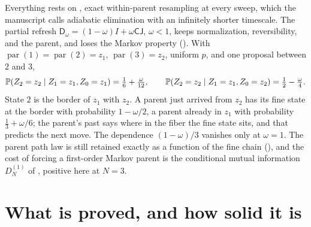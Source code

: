 Everything rests on , exact within-parent resampling at every
sweep, which the manuscript calls adiabatic elimination with an infinitely shorter timescale. The
partial refresh $\mathsf D_\omega=(1-\omega)I+\omega\mathsf C\mathsf J$, $\omega<1$, keeps
normalization, reversibility, and the parent, and loses the Markov property
(). With $\operatorname{par}(1)=\operatorname{par}(2)=z_1$,
$\operatorname{par}(3)=z_2$, uniform $p$, and one proposal between $2$ and $3$,
\[
\mathbb P(Z_2=z_2\mid Z_1=z_1,Z_0=z_1)=\tfrac16+\tfrac{\omega}{12},
\qquad
\mathbb P(Z_2=z_2\mid Z_1=z_1,Z_0=z_2)=\tfrac12-\tfrac{\omega}{4}.
\]
State $2$ is the border of $z_1$ with $z_2$. A parent just arrived from $z_2$ has its fine state at the
border with probability $1-\omega/2$, a parent already in $z_1$ with probability $\tfrac13+\omega/6$;
the parent's past says where in the fiber the fine state sits, and that predicts the next move. The
dependence $(1-\omega)/3$ vanishes only at $\omega=1$. The parent path law is still retained exactly
as a function of the fine chain (), and the cost of forcing a
first-order Markov parent is the conditional mutual information $D^{(1)}_N$ of
, positive here at $N=3$.

\section{What is proved, and how solid it is}
\label{comp:ch08-status}

